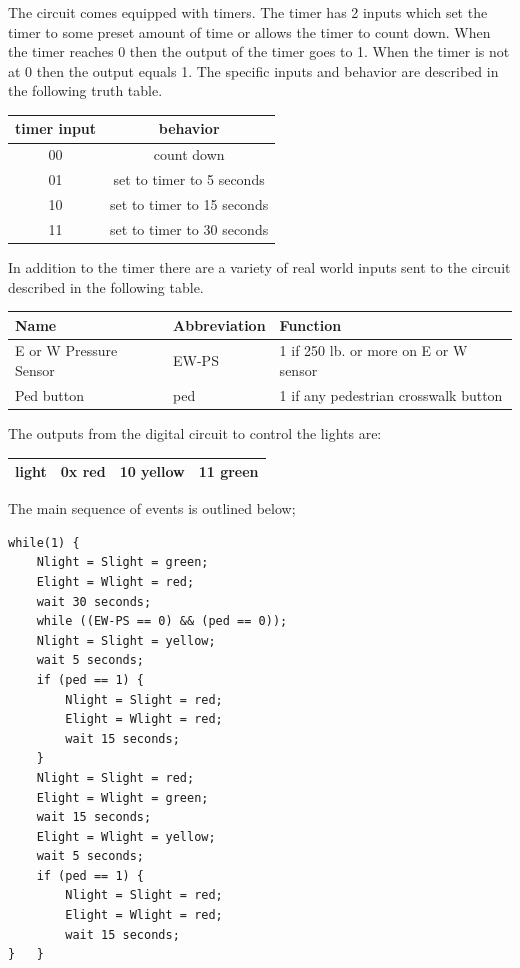 \begin{enumerate}
The circuit comes equipped with timers.
The timer has 2 inputs which set the timer to some preset
amount of time or allows the timer to count down.  When the
timer reaches 0 then the output of the timer goes to 1.
When the timer is not at 0 then the output equals 1.
The specific inputs and behavior are described in the following
truth table.

\begin{tabular}{|c|c|} \hline
timer input & behavior          \\ \hline \hline
00 & count down                 \\ \hline
01 & set to timer to 5  seconds \\ \hline
10 & set to timer to 15 seconds \\ \hline
11 & set to timer to 30 seconds \\ \hline
\end{tabular}

In addition to the timer there are a variety of real world inputs
sent to the circuit described in the following table.

\begin{tabular}{|l|l|l|} \hline
Name                    & Abbreviation & Function \\                       \hline \hline
E or W Pressure Sensor  & EW-PS & 1 if 250 lb. or more on E or W sensor \\ \hline
Ped button              & ped   & 1 if any pedestrian crosswalk button  \\ \hline
\end{tabular}

The outputs from the digital circuit to control the lights are:

\begin{tabular}{|l|l|l|l|} \hline
light           & 0x red &  10 yellow & 11 green \\ \hline
\end{tabular}

The main sequence of events is outlined below;
\begin{verbatim}
while(1) {
    Nlight = Slight = green;
    Elight = Wlight = red;
    wait 30 seconds;
    while ((EW-PS == 0) && (ped == 0));
    Nlight = Slight = yellow;
    wait 5 seconds;
    if (ped == 1) {
        Nlight = Slight = red;
        Elight = Wlight = red;
        wait 15 seconds;
    }
    Nlight = Slight = red;
    Elight = Wlight = green;
    wait 15 seconds;
    Elight = Wlight = yellow;
    wait 5 seconds;
    if (ped == 1) {
        Nlight = Slight = red;
        Elight = Wlight = red;
        wait 15 seconds;
}   }
\end{verbatim}



\end{enumerate}
